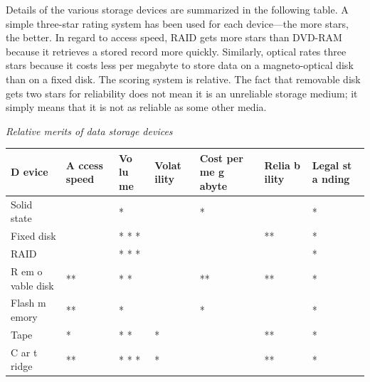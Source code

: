 \documentclass[
]{article}
\begin{document}
Details of the various storage devices are summarized in the following
table. A simple three-star rating system has been used for each
device---the more stars, the better. In regard to access speed, RAID
gets more stars than DVD-RAM because it retrieves a stored record more
quickly. Similarly, optical rates three stars because it costs less per
megabyte to store data on a magneto-optical disk than on a fixed disk.
The scoring system is relative. The fact that removable disk gets two
stars for reliability does not mean it is an unreliable storage medium;
it simply means that it is not as reliable as some other media.

\emph{Relative merits of data storage devices}

\begin{longtable}[]{@{}
  >{\raggedright\arraybackslash}p{}
  >{\raggedright\arraybackslash}p{}
  >{\raggedright\arraybackslash}p{}
  >{\raggedright\arraybackslash}p{}
  >{\raggedright\arraybackslash}p{}
  >{\raggedright\arraybackslash}p{}
  >{\raggedright\arraybackslash}p{}@{}}
\toprule
D evice & A ccess
speed & Vo lu
me & Volat
ility & Cost
per me
g abyte & Relia b
ility & Legal
st a
nding \\
\midrule
\endhead
Solid
state & \vtop{\hbox{\strut }\hbox{\strut ***}} & * & \vtop{\hbox{\strut }\hbox{\strut ***}} & * & \vtop{\hbox{\strut }\hbox{\strut ***}} & * \\
Fixed
disk & \vtop{\hbox{\strut }\hbox{\strut ***}} & * *
* & \vtop{\hbox{\strut }\hbox{\strut ***}} & \vtop{\hbox{\strut }\hbox{\strut ***}} & ** & * \\
RAID & \vtop{\hbox{\strut }\hbox{\strut ***}} & * *
* & \vtop{\hbox{\strut }\hbox{\strut ***}} & \vtop{\hbox{\strut }\hbox{\strut ***}} & \vtop{\hbox{\strut }\hbox{\strut ***}} & * \\
R em o
vable
disk & ** & * * & \vtop{\hbox{\strut }\hbox{\strut ***}} & ** & ** & * \\
Flash m
emory & ** & * & \vtop{\hbox{\strut }\hbox{\strut ***}} & * & \vtop{\hbox{\strut }\hbox{\strut ***}} & * \\
Tape & * & * * & * & \vtop{\hbox{\strut }\hbox{\strut ***}} & ** & * \\
C ar t
ridge & ** & * *
* & * & \vtop{\hbox{\strut }\hbox{\strut ***}} & ** & * \\

\end{longtable}
\end{document}
